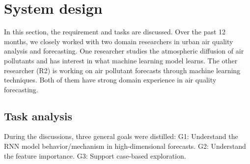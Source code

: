 \section{System design}
In this section, the requirement and tasks are discussed. Over the past 12 months, we closely worked with two domain researchers in urban air quality analysis and forecasting. 
One researcher  studies the atmospheric diffusion of air pollutants and has interest in what machine learning model learns.
The other researcher (R2) is working on air pollutant forecasts through machine learning techniques. Both of them have strong domain experience in air quality forecasting. 

\subsection{Task analysis}

During the discussions, three general goals were distilled:
G1: Understand the RNN model behavior/mechanism in high-dimensional forecasts. 
G2: Understand the feature importance. 
G3: Support case-based exploration.


